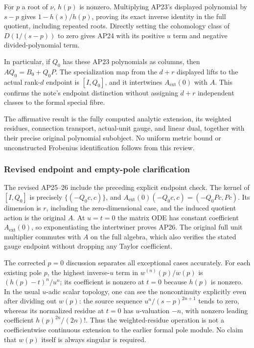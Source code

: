 For \(p\) a root of \(\nu\), \(h(p)\) is nonzero. Multiplying AP23's displayed polynomial by \(s-p\) gives \(1-h(s)/h(p)\), proving its exact inverse identity in the full quotient, including repeated roots. Directly setting the cohomology class of \(D(1/(s-p))\) to zero gives AP24 with its positive \(u\) term and negative divided-polynomial term.

In particular, if \(Q_0\) has these AP23 polynomials as columns, then \(A Q_0=B_0+Q_0 P\). The specialization map from the \(d+r\) displayed lifts to the actual rank-\(d\) endpoint is \([I,Q_0]\), and it intertwines \(A_{\mathrm{ext}}(0)\) with \(A\). This confirms the note's endpoint distinction without assigning \(d+r\) independent classes to the formal special fibre.

The affirmative result is the fully computed analytic extension, its weighted residues, connection transport, actual-unit gauge, and linear dual, together with their precise original polynomial subobject. No uniform metric bound or unconstructed Frobenius identification follows from this review.

\subsubsection{Revised endpoint and empty-pole clarification}\label{endpoint-analytic_pole_review--revised-endpoint-and-empty-pole-clarification}

The revised AP25--26 include the preceding explicit endpoint check. The kernel of \([I,Q_0]\) is precisely \(\{(-Q_0 c,c)\}\), and \(A_{\mathrm{ext}}(0)(-Q_0 c,c)=(-Q_0 Pc,Pc)\). Its dimension is \(r\), including the zero-dimensional case, and the induced quotient action is the original \(A\). At \(u=t=0\) the matrix ODE has constant coefficient \(A_{\mathrm{ext}}(0)\), so exponentiating the intertwiner proves AP26. The original full unit multiplier commutes with \(A\) on the full algebra, which also verifies the stated gauge endpoint without dropping any Taylor coefficient.

The corrected \(p=0\) discussion separates all exceptional cases accurately. For each existing pole \(p\), the highest inverse-\(u\) term in \(w^{(n)}(p)/w(p)\) is \((h(p)-t)^n/u^n\); its coefficient is nonzero at \(t=0\) because \(h(p)\) is nonzero. In the usual \(u\)-adic scalar topology, one can see the noncontinuity explicitly even after dividing out \(w(p)\): the source sequence \(u^n/(s-p)^{2n+1}\) tends to zero, whereas its normalized residue at \(t=0\) has \(u\)-valuation \(-n\), with nonzero leading coefficient \(h(p)^{2n}/(2n)!\). Thus the weighted-residue operation is not a coefficientwise continuous extension to the earlier formal pole module. No claim that \(w(p)\) itself is always singular is required.

